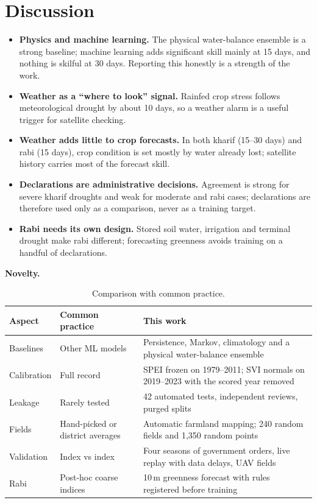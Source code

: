 \documentclass[11pt,a4paper,oneside]{article}
\begin{document}
\section{Discussion}
\begin{itemize}
\item \textbf{Physics and machine learning.} The physical water-balance ensemble is a strong baseline; machine learning adds significant skill mainly at 15 days, and nothing is skilful at 30 days. Reporting this honestly is a strength of the work.
\item \textbf{Weather as a ``where to look'' signal.} Rainfed crop stress follows meteorological drought by about 10 days, so a weather alarm is a useful trigger for satellite checking.
\item \textbf{Weather adds little to crop forecasts.} In both kharif (15--30 days) and rabi (15 days), crop condition is set mostly by water already lost; satellite history carries most of the forecast skill.
\item \textbf{Declarations are administrative decisions.} Agreement is strong for severe kharif droughts and weak for moderate and rabi cases; declarations are therefore used only as a comparison, never as a training target.
\item \textbf{Rabi needs its own design.} Stored soil water, irrigation and terminal drought make rabi different; forecasting greenness avoids training on a handful of declarations.
\end{itemize}

\textbf{Novelty.}
\begin{table}[H]
\centering
\caption{Comparison with common practice.}
\label{tab:novelty}
\footnotesize
\begin{tabularx}{\textwidth}{@{}p{2.4cm}p{4.2cm}Y@{}}
\toprule
\textbf{Aspect} & \textbf{Common practice} & \textbf{This work} \\
\midrule
Baselines & Other ML models & Persistence, Markov, climatology and a physical water-balance ensemble \\
Calibration & Full record & SPEI frozen on 1979--2011; SVI normals on 2019--2023 with the scored year removed \\
Leakage & Rarely tested & 42 automated tests, independent reviews, purged splits \\
Fields & Hand-picked or district averages & Automatic farmland mapping; 240 random fields and 1,350 random points \\
Validation & Index vs index & Four seasons of government orders, live replay with data delays, UAV fields \\
Rabi & Post-hoc coarse indices & 10\,m greenness forecast with rules registered before training \\
\bottomrule
\end{tabularx}
\end{table}
\end{document}
